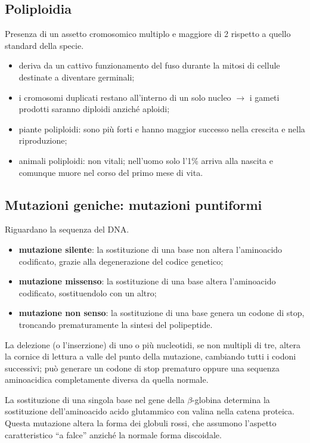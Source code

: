 \subsection{Poliploidia}

Presenza di un assetto cromosomico multiplo e maggiore di 2 rispetto a quello standard della specie.
\begin{itemize}
  \item deriva da un cattivo funzionamento del fuso durante la mitosi di cellule destinate a diventare germinali;
  \item i cromosomi duplicati restano all'interno di un solo nucleo $\rightarrow$ i gameti prodotti saranno diploidi anziché aploidi;
  \item piante poliploidi: sono più forti e hanno maggior successo nella crescita e nella riproduzione;
  \item animali poliploidi: non vitali; nell'uomo solo l'1\% arriva alla nascita e comunque muore nel corso del primo mese di vita.
\end{itemize}

\subsection{Mutazioni geniche: mutazioni puntiformi}

Riguardano la sequenza del DNA.

\begin{itemize}
  \item \textbf{mutazione silente}: la sostituzione di una base non altera l'aminoacido codificato, grazie alla degenerazione del codice genetico;
  \item \textbf{mutazione missenso}: la sostituzione di una base altera l'aminoacido codificato, sostituendolo con un altro;
  \item \textbf{mutazione non senso}: la sostituzione di una base genera un codone di stop, troncando prematuramente la sintesi del polipeptide.
\end{itemize}

La delezione (o l'inserzione) di uno o più nucleotidi, se non multipli di tre, altera la cornice di lettura a valle del punto della mutazione, cambiando tutti i codoni successivi; può generare un codone di stop prematuro oppure una sequenza aminoacidica completamente diversa da quella normale.

La sostituzione di una singola base nel gene della $\beta$-globina determina la sostituzione dell'aminoacido acido glutammico con valina nella catena proteica. Questa mutazione altera la forma dei globuli rossi, che assumono l'aspetto caratteristico ``a falce'' anziché la normale forma discoidale.
